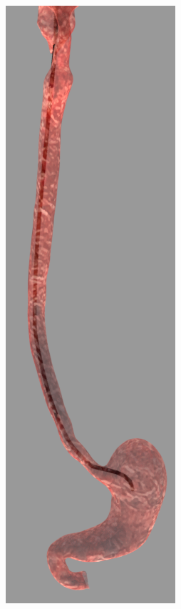 \documentclass[12pt,a4]{article}
\begin{document}
\begin{figure}[ht!]
\begin{subfigure}{0.15\textwidth}
    \end{subfigure}%
		~   
       \begin{subfigure}{0.15\textwidth}
        \centering
        \includegraphics[width=0.6\linewidth]{figures/GIsnaps/4.png}
       

\end{subfigure}
\end{figure}
\end{document}

